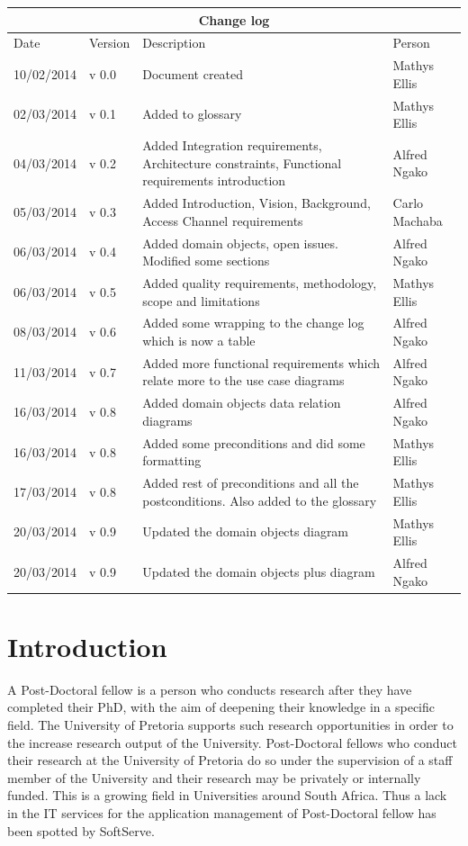 \documentclass[12pt]{article}
\begin{document}
\begin{center}
\begin{tabular}{|l|p{1.4cm}|p{8cm}|p{2.8cm}|}
\hline
\multicolumn{4}{|c|}{\bf Change log} \\
\hline
 Date & Version & Description &  Person \\
\hline
10/02/2014 & v 0.0 & Document created & Mathys Ellis \\
\hline
02/03/2014 & v 0.1 & Added to glossary & Mathys Ellis \\
\hline
04/03/2014 & v 0.2 & Added Integration requirements, Architecture constraints, Functional requirements introduction & Alfred Ngako \\
\hline
05/03/2014 & v 0.3 & Added Introduction, Vision, Background, Access Channel requirements & Carlo Machaba \\
\hline
06/03/2014 & v 0.4 & Added domain objects, open issues. Modified some sections & Alfred Ngako \\
\hline
06/03/2014 & v 0.5 & Added quality requirements, methodology, scope and limitations & Mathys Ellis \\
\hline
08/03/2014 & v 0.6 & Added some wrapping to the change log which is now a table & Alfred Ngako \\
\hline
11/03/2014 & v 0.7 & Added more functional requirements which relate more to the use case diagrams & Alfred Ngako \\
\hline
16/03/2014 & v 0.8 & Added domain objects data relation diagrams & Alfred Ngako \\
\hline
16/03/2014 & v 0.8 & Added some preconditions and did some formatting & Mathys Ellis \\
\hline
17/03/2014 & v 0.8 & Added rest of preconditions and all the postconditions. Also added to the glossary & Mathys Ellis \\
\hline
20/03/2014 & v 0.9 & Updated the domain objects diagram  & Mathys Ellis \\
\hline
20/03/2014 & v 0.9 & Updated the domain objects plus diagram  & Alfred Ngako \\
\hline
\end{tabular}
\end{center}
\newpage
\tableofcontents

\listoffigures
\newpage
\section{Introduction} %
A Post-Doctoral fellow is a person who conducts research after they have completed their PhD, with the aim of deepening their knowledge in a specific field. The University of Pretoria supports such research opportunities in order to the increase research output of the University. Post-Doctoral fellows who conduct their research at the University of Pretoria do so under the supervision of a staff member of the University and their research may be privately or internally funded. This is a growing field in Universities around South Africa. Thus a lack in the IT services for the application management of Post-Doctoral fellow has been spotted by SoftServe.
\vspace{0.2in}
\end{document}
